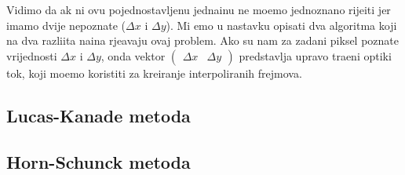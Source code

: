 Vidimo da \ch ak ni ovu pojednostavljenu jedna\ch inu ne mo\zh emo jednozna\ch no rije\sh iti jer imamo dvije nepoznate ($\Delta x$ i $\Delta y$). Mi \cj emo u nastavku opisati dva algoritma koji
na dva razli\ch ita na\ch ina rje\sh avaju ovaj problem. Ako su nam za zadani piksel poznate vrijednosti $\Delta x$ i $\Delta y$, onda vektor $(\begin{smallmatrix}\Delta x &\Delta y\end{smallmatrix})$ predstavlja upravo tra\zh eni opti\ch ki tok,
koji mo\zh emo koristiti za kreiranje interpoliranih frejmova.

\subsection{Lucas-Kanade metoda}


\subsection{Horn-Schunck metoda}
